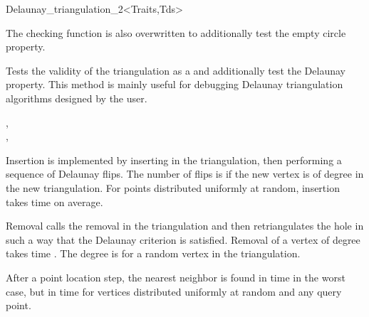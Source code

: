 \begin{ccRefClass}{Delaunay_triangulation_2<Traits,Tds>}
\begin{ccAdvanced}

The checking function  is also overwritten
to additionally test the empty circle property.

{ Tests the validity of the triangulation as a 
and additionally test the Delaunay property. This method is
 mainly  useful for debugging Delaunay triangulation algorithms designed by
 the user.}
\end{ccAdvanced}




\ccSeeAlso

, \\
, \\







Insertion is implemented by inserting in the triangulation, then
performing a sequence of Delaunay flips. The number of flips is 
if the new vertex is of degree  in the new triangulation. For
points distributed uniformly at random, insertion takes time  on
average.

Removal calls the removal in the triangulation and then retriangulates
the hole in such a way that  the Delaunay criterion is satisfied. Removal of a
vertex of degree  takes time .
The degree  is  for a random
vertex in the triangulation.

After a point location step, the nearest neighbor 
is found in time  in the
worst case, but in time 
for vertices distributed uniformly at random  and any query point. 


\end{ccRefClass}


